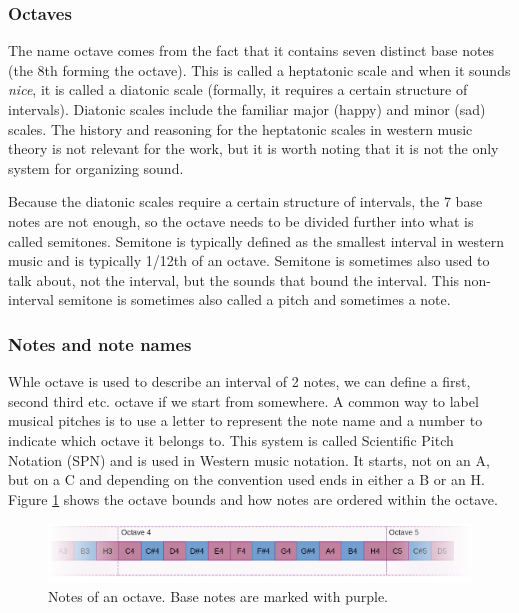 \subsubsection{Octaves}
The name octave comes from the fact that it contains seven distinct base notes (the 8th forming the octave). This is called a heptatonic scale and when it sounds \textit{nice}, it is called a diatonic scale (formally, it requires a certain structure of intervals). Diatonic scales include the familiar major (happy) and minor (sad) scales. The history and reasoning for the heptatonic scales in western music theory is not relevant for the work, but it is worth noting that it is not the only system for organizing sound. 

Because the diatonic scales require a certain structure of intervals, the 7 base notes are not enough, so the octave needs to be divided further into what is called semitones. Semitone is typically defined as the smallest interval in western music and is typically 1/12th of an octave. Semitone is sometimes also used to talk about, not the interval, but the sounds that bound the interval. This non-interval semitone is sometimes also called a pitch and sometimes a note.

\subsubsection{Notes and note names}
Whle octave is used to describe an interval of 2 notes, we can define a first, second third etc. octave if we start from somewhere. A common way to label musical pitches is to use a letter to represent the note name and a number to indicate which octave it belongs to. This system is called Scientific Pitch Notation (SPN) and is used in Western music notation. It starts, not on an A, but on a C and depending on the convention used ends in either a B or an H. Figure \ref{fig:noteScale} shows the octave bounds and how notes are ordered within the octave.

\begin{figure}[ht]
    \centering
    \includegraphics[width=\textwidth]{./images/noteScale.png}
    \caption{Notes of an octave. Base notes are marked with purple. \label{fig:noteScale}}
\end{figure}

